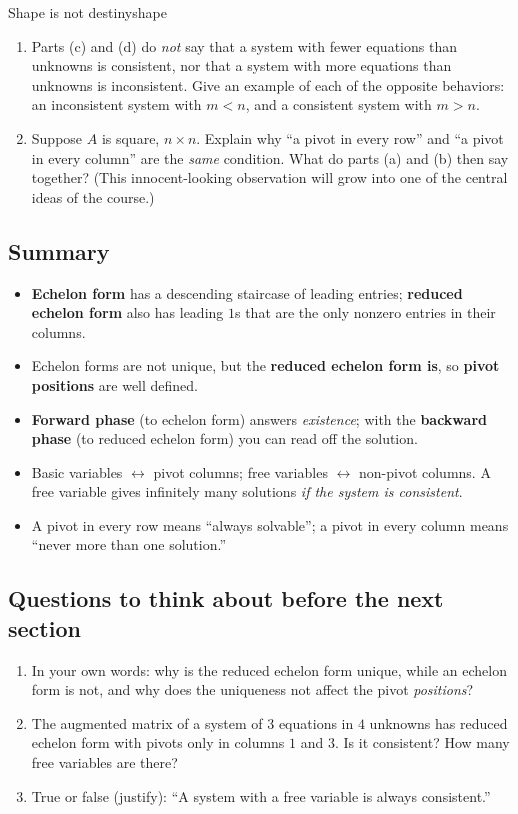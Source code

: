 \documentclass[11pt]{article}
\begin{document}
\begin{think}{Shape is not destiny}{shape}
\begin{enumerate}[label=(\arabic*)]
  \item Parts (c) and (d) do \emph{not} say that a system with fewer equations than unknowns is consistent, nor that
        a system with more equations than unknowns is inconsistent. Give an example of each of the opposite
        behaviors: an inconsistent system with $m<n$, and a consistent system with $m>n$.
  \item Suppose $A$ is square, $n\times n$. Explain why ``a pivot in every row'' and ``a pivot in every
        column'' are the \emph{same} condition. What do parts (a) and (b) then say together?
        (This innocent-looking observation will grow into one of the central ideas of the course.)
\end{enumerate}
\end{think}
 
\subsection*{Summary}
\begin{itemize}
  \item \textbf{Echelon form} has a descending staircase of leading entries; \textbf{reduced echelon form} also has
        leading $1$s that are the only nonzero entries in their columns.
  \item Echelon forms are not unique, but the \textbf{reduced echelon form is}, so \textbf{pivot positions} are
        well defined.
  \item \textbf{Forward phase} (to echelon form) answers \emph{existence}; with the \textbf{backward phase} (to
        reduced echelon form) you can read off the solution.
  \item Basic variables $\leftrightarrow$ pivot columns; free variables $\leftrightarrow$ non-pivot columns. A free
        variable gives infinitely many solutions \emph{if the system is consistent}.
  \item A pivot in every row means ``always solvable''; a pivot in every column means ``never more than one solution.''
\end{itemize}
 
\subsection*{Questions to think about before the next section}
\begin{enumerate}
  \item In your own words: why is the reduced echelon form unique, while an echelon form is not, and why does
        the uniqueness not affect the pivot \emph{positions}?
  \item The augmented matrix of a system of $3$ equations in $4$ unknowns has reduced echelon form with pivots only
        in columns $1$ and $3$. Is it consistent? How many free variables are there?
  \item True or false (justify): ``A system with a free variable is always consistent.''
\end{enumerate}
 
\end{document}
